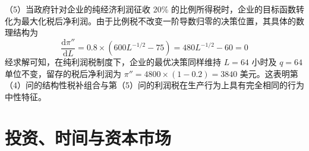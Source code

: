 \begin{enumerate}[label=\textbf{\arabic*.}, leftmargin=*]
		（5）当政府针对企业的纯经济利润征收 20\% 的比例所得税时，企业的目标函数转化为最大化税后净利润。由于比例税不改变一阶导数归零的决策位置，其具体的数理结构为
		\[
		\frac{\text{d}\pi''}{\text{d}L} = 0.8 \times \left( 600L^{-1/2} - 75 \right) = 480L^{-1/2} - 60 = 0
		\]
		经求解可知，在纯利润税制度下，企业的最优决策同样维持 $L = 64$ 小时及 $q = 64$ 单位不变，留存的税后净利润为 $\pi'' = 4800 \times (1 - 0.2) = 3840$ 美元。这表明第（4）问的结构性税补组合与第（5）问的利润税在生产行为上具有完全相同的行为中性特征。
		
	\end{enumerate}
	
	\chapter{投资、时间与资本市场}
	
